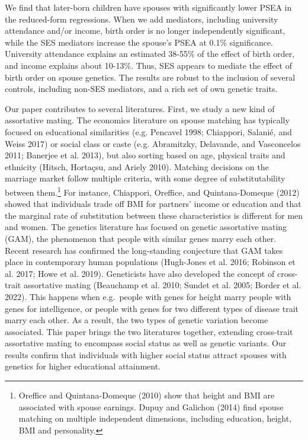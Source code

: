 \documentclass[
]{article}
\theoremstyle{definition}
\theoremstyle{definition}
\theoremstyle{definition}
\theoremstyle{definition}
\theoremstyle{remark}
\begin{document}
We find that later-born children have spouses with significantly lower PSEA in
the reduced-form regressions. When we add mediators, including university
attendance and/or income, birth order is no longer independently significant,
while the SES mediators increase the spouse's PSEA at 0.1\% significance.
University attendance explains an estimated 38-55\% of the effect of birth order,
and income explains about 10-13\%. Thus, SES appears to mediate the effect of
birth order on spouse genetics. The results are robust to the inclusion of
several controls, including non-SES mediators, and a rich set of own genetic
traits.

Our paper contributes to several literatures. First, we study a new kind of
assortative mating. The economics literature on spouse matching has typically
focused on educational similarities (e.g. Pencavel 1998; Chiappori, Salanié, and Weiss 2017) or social class or caste (e.g. Abramitzky, Delavande, and Vasconcelos 2011; Banerjee et al. 2013), but also sorting based on age,
physical traits and ethnicity (Hitsch, Hortaçsu, and Ariely 2010). Matching decisions on the
marriage market follow multiple criteria, with some degree of substitutability
between them.\footnote{Oreffice and Quintana-Domeque (2010) show that height and BMI are associated
  with spouse earnings. Dupuy and Galichon (2014) find spouse matching on multiple
  independent dimensions, including education, height, BMI and personality.} For instance, Chiappori, Oreffice, and Quintana-Domeque (2012) showed that
individuals trade off BMI for partners' income or education and that the
marginal rate of substitution between these characteristics is different for men
and women. The genetics literature has focused on genetic assortative mating
(GAM), the phenomenon that people with similar genes marry each other. Recent
research has confirmed the long-standing conjecture that GAM takes place in
contemporary human populations (Hugh-Jones et al. 2016; Robinson et al. 2017; Howe et al. 2019). Geneticists have also developed the
concept of cross-trait assortative mating (Beauchamp et al. 2010; Sundet et al. 2005; Border et al. 2022). This happens when e.g.~people with genes for height marry
people with genes for intelligence, or people with genes for two different types
of disease trait marry each other. As a result, the two types of genetic
variation become associated. This paper brings the two literatures together,
extending cross-trait assortative mating to encompass social status as well as
genetic variants. Our results confirm that individuals with higher social status
attract spouses with genetics for higher educational attainment.
\end{document}
